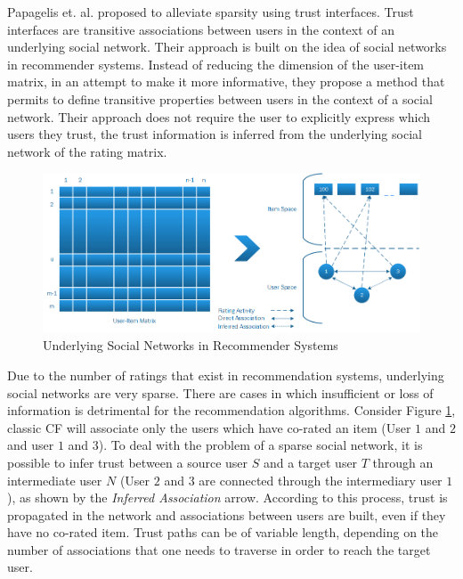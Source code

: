 
Papagelis et. al. \cite{Papagelis2005} proposed to alleviate sparsity using
trust interfaces. Trust interfaces are transitive associations between users in
the context of an underlying social network. Their approach is built on the
idea of social networks in recommender systems. Instead of reducing the
dimension of the user-item matrix, in an attempt to make it more informative,
they propose a method that permits to define transitive properties between
users in the context of a social network. Their approach does not require the
user to explicitly express which users they trust, the trust information is
inferred from the underlying social network of the rating matrix.

\begin{figure}[H]
    \includegraphics[width=5in]{image/trustnetwork.png}
    \centering
    \caption[Underlying Social Networks in Recommender Systems]{Underlying Social Networks in Recommender Systems}
    \label{figure:cfsocialnetwork}
\end{figure}

Due to the number of ratings that exist in recommendation systems, underlying
social networks are very sparse. There are cases in which insufficient or loss
of information is detrimental for the recommendation algorithms. Consider
Figure \ref{figure:cfsocialnetwork}, classic CF will associate only the users
which have co-rated an item (User $1$ and $2$ and user $1$ and $3$). To deal
with the problem of a sparse social network, it is possible to infer trust
between a source user $S$ and a target user $T$ through an intermediate user
$N$ (User $2$ and $3$ are connected through the intermediary user $1$), as
shown by the \emph{Inferred Association} arrow. According to this process,
trust is propagated in the network and associations between users are built,
even if they have no co-rated item. Trust paths can be of variable length,
depending on the number of associations that one needs to traverse in order to
reach the target user.

